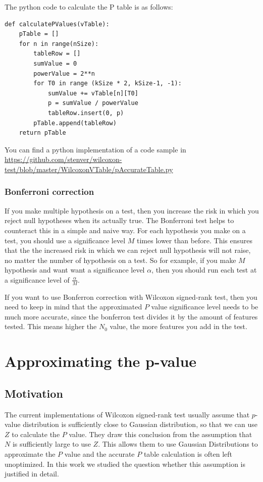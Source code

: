 \documentclass[12pt]{article}
\begin{document}
The python code to calculate the P table is as follows:

\begin{verbatim}
def calculatePValues(vTable):
    pTable = []
    for n in range(nSize):
        tableRow = []
        sumValue = 0
        powerValue = 2**n
        for T0 in range (kSize * 2, kSize-1, -1):
            sumValue += vTable[n][T0]
            p = sumValue / powerValue
            tableRow.insert(0, p)
        pTable.append(tableRow)
    return pTable

\end{verbatim}

You can find a python implementation of a code sample in
\url{https://github.com/stenver/wilcoxon-test/blob/master/WilcoxonVTable/pAccurateTable.py}

\subsubsection{Bonferroni correction}

If you make multiple hypothesis on a test, then you increase the risk in which you reject null hypotheses when its actually true. The Bonferroni test helps to counteract this in a simple and naive way. For each hypothesis you make on a test, you should use a significance level $M$ times lower than before. This ensures that the the increased risk in which we can reject null hypothesis will not raise, no matter the number of hypothesis on a test. So for example, if you make $M$ hypothesis and want want a significance level $\alpha$,  then you should run each test at a significance level of $\frac{\alpha}{M}$.

If you want to use Bonferron correction with Wilcoxon signed-rank test, then you need to keep in mind that the approximated $P$ value significance level needs to be much more accurate, since the bonferron test divides it by the amount of features tested. This means higher the $N_0$ value, the more features you add in the test.

\newpage

\section{Approximating the p-value}

\subsection{Motivation}
The current implementations of Wilcoxon signed-rank test usually assume that $p$-value distribution is sufficiently close to Gaussian distribution, so that we can use $Z$ to calculate the $P$ value. They draw this conclusion from the assumption that $N$ is sufficiently large to use $Z$. This allows them to use Gaussian Distributions to approximate the $P$ value and the accurate $P$ table calculation is often left unoptimized. In this work we studied the question whether this assumption is justified in detail.
\end{document}
